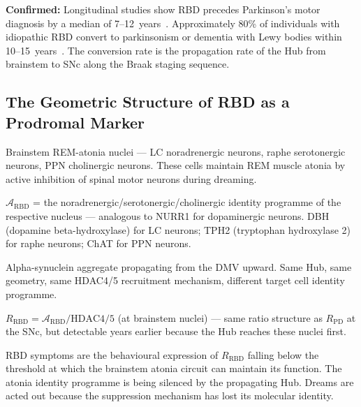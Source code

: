 \documentclass[12pt,a4paper]{article}
\begin{document}
\textbf{Confirmed:} Longitudinal studies show RBD precedes Parkinson's
motor diagnosis by a median of 7--12~years~\cite{Postuma2019}.
Approximately 80\% of individuals with idiopathic RBD convert to
parkinsonism or dementia with Lewy bodies within 10--15~years~\cite{Iranzo2019}.
The conversion rate is the propagation rate of the Hub from brainstem
to SNc along the Braak staging sequence.

\subsection{The Geometric Structure of RBD as a Prodromal Marker}

\begin{description}[leftmargin=2em, itemsep=0.5em]
  \item[\textbf{Cell of origin (RBD):}] Brainstem REM-atonia nuclei ---
    LC noradrenergic neurons, raphe serotonergic neurons, PPN
    cholinergic neurons. These cells maintain REM muscle atonia by active
    inhibition of spinal motor neurons during dreaming.

  \item[\textbf{Identity Anchor (RBD):}]
    $\mathcal{A}_{\mathrm{RBD}}$ = the noradrenergic/serotonergic/cholinergic
    identity programme of the respective nucleus --- analogous to NURR1
    for dopaminergic neurons. DBH (dopamine beta-hydroxylase) for LC neurons;
    TPH2 (tryptophan hydroxylase 2) for raphe neurons; ChAT for PPN neurons.

  \item[\textbf{Hub (RBD):}] Alpha-synuclein aggregate propagating from the
    DMV upward. Same Hub, same geometry, same HDAC4/5 recruitment mechanism,
    different target cell identity programme.

  \item[\textbf{Identity Axis (RBD):}]
    $R_{\mathrm{RBD}} = \mathcal{A}_{\mathrm{RBD}} / \mathrm{HDAC4/5}$
    (at brainstem nuclei) --- same ratio structure as $R_{\mathrm{PD}}$ at
    the SNc, but detectable years earlier because the Hub reaches these nuclei
    first.

  \item[\textbf{Clinical readout:}] RBD symptoms are the behavioural
    expression of $R_{\mathrm{RBD}}$ falling below the threshold at which
    the brainstem atonia circuit can maintain its function. The atonia
    identity programme is being silenced by the propagating Hub. Dreams
    are acted out because the suppression mechanism has lost its molecular
    identity.
\end{description}
\end{document}
